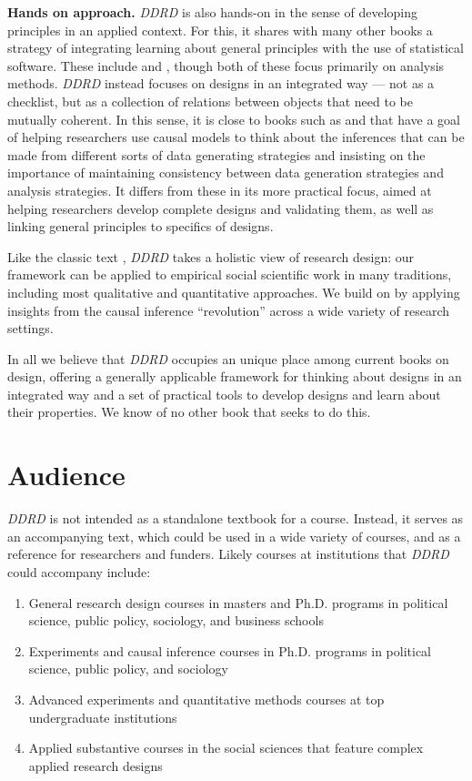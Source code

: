 \documentclass[11pt]{article}
\begin{document}
\textbf{Hands on approach.} \textit{DDRD} is also hands-on in the sense of developing principles in an applied context. For this, it shares with many other books a strategy of integrating learning about general principles with the use of statistical software. These include \citet{gelman2006data} and  \citet{james2014introduction}, though both of these focus primarily on analysis methods.  
\textit{DDRD} instead focuses on designs in an integrated way --- not as a checklist, but as a collection of relations between objects that need to be mutually coherent. In this sense, it is close to books such as \citet{Gerber2012} and \citet{dunning2012natural} that have a goal of helping researchers use causal models to think about the inferences that can be made from different sorts of data generating strategies and insisting on the importance of maintaining consistency between data generation strategies and analysis strategies. It differs from these in its more practical focus, aimed at helping researchers develop complete designs and validating them, as well as linking general principles to specifics of designs. 

Like the classic text \citet{king1994designing}, \textit{DDRD} takes a holistic view of research design: our framework can be applied to empirical social scientific work in many traditions, including most qualitative and quantitative approaches. We build on \citet{king1994designing} by applying insights from the causal inference ``revolution'' across a wide variety of research settings.

In all we believe that \textit{DDRD} occupies an unique place among current books on design, offering a generally applicable framework for thinking about designs in an integrated way and a set of practical tools to develop designs and learn about their properties. We know of no other book that seeks to do this.

\clearpage
\section{Audience}

\textit{DDRD} is not intended as a standalone textbook for a course. Instead, it serves as an accompanying text, which could be used in a wide variety of courses, and as a reference for researchers and funders. Likely courses at institutions that \textit{DDRD} could accompany include:

\begin{enumerate}
\item General research design courses in masters and Ph.D. programs in political science, public policy, sociology, and business schools
\item Experiments and causal inference courses in Ph.D. programs in political science, public policy, and sociology
\item Advanced experiments and quantitative methods courses at top undergraduate institutions
\item Applied substantive courses in the social sciences that feature complex applied research designs
\end{enumerate}
\end{document}
